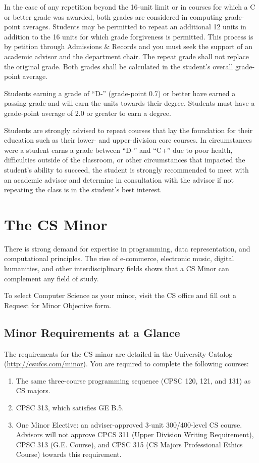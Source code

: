 \documentclass{book}
\newcommand{\shrunkurl}[1]{\url{http://csufcs.com/#1}}
\begin{document}
In the case of any repetition beyond the 16-unit limit or in courses
for which a C or better grade was awarded, both grades are considered
in computing grade-point averages. Students may be permitted to repeat
an additional 12 units in addition to the 16 units for which grade
forgiveness is permitted. This process is by petition through
Admissions \& Records and you must seek the support of an academic
advisor and the department chair. The repeat grade shall not replace
the original grade. Both grades shall be calculated in the student’s
overall grade-point average.

Students earning a grade of ``D-'' (grade-point 0.7) or better have
earned a passing grade and will earn the units towards their
degree. Students must have a grade-point average of 2.0 or greater to
earn a degree.

Students are strongly advised to repeat courses that lay the
foundation for their education such as their lower- and upper-division
core courses. In circumstances were a student earns a grade between
``D-'' and ``C+'' due to poor health, difficulties outside of the
classroom, or other circumstances that impacted the student's ability
to succeed, the student is strongly recommended to meet with an
academic advisor and determine in consultation with the advisor if not
repeating the class is in the student's best interest.


\chapter{The CS Minor}

There is strong demand for expertise in programming, data
representation, and computational principles. The rise of e-commerce,
electronic music, digital humanities, and other interdisciplinary
fields shows that a CS Minor can complement any field of study.

To select Computer Science as your minor, visit the CS office and fill
out a Request for Minor Objective form.

\section{Minor Requirements at a Glance}
The requirements for the CS minor are detailed in the University
Catalog (\shrunkurl{minor}). You are required to complete the
following courses:
\begin{enumerate}
  \item The same three-course programming sequence (CPSC 120, 121, and
    131) as CS majors.
  \item CPSC 313, which satisfies GE B.5.
  \item One Minor Elective: an adviser-approved 3-unit 300/400-level
    CS course. Advisors will not approve CPCS 311 (Upper Division
    Writing Requirement), CPSC 313 (G.E. Course), and CPSC 315 (CS
    Majors Professional Ethics Course) towards this requirement.
\end{enumerate}
\end{document}
